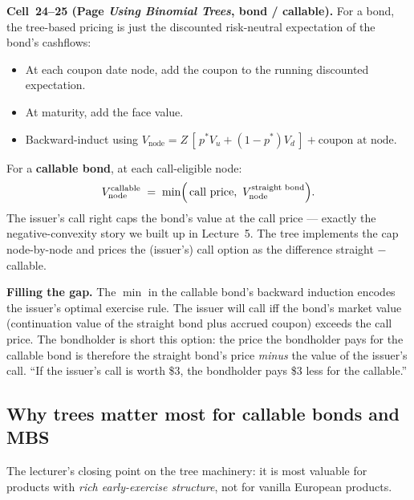 \begin{keyblock}
\textbf{Cell~24--25 (Page \emph{Using Binomial Trees}, bond / callable).}
For a bond, the tree-based pricing is just the discounted
risk-neutral expectation of the bond's cashflows:
\begin{itemize}
  \item At each coupon date node, add the coupon to the running
        discounted expectation.
  \item At maturity, add the face value.
  \item Backward-induct using $V_{\text{node}} = Z\,[\,p^* V_u +
        (1-p^*) V_d\,] + \text{coupon at node}$.
\end{itemize}
For a \textbf{callable bond}, at each call-eligible node:
\[
  V_{\text{node}}^{\text{callable}}
    \;=\; \min\Bigl(\,
              \text{call price},\ V_{\text{node}}^{\text{straight bond}}
            \Bigr).
\]
The issuer's call right caps the bond's value at the call price ---
exactly the negative-convexity story we built up in Lecture~5.
The tree implements the cap node-by-node and prices the (issuer's)
call option as the difference straight $-$ callable.
\end{keyblock}

\begin{tipblock}
\textbf{Filling the gap.} The $\min$ in the callable bond's
backward induction encodes the issuer's optimal exercise rule.
The issuer will call iff the bond's market value (continuation
value of the straight bond plus accrued coupon) exceeds the call
price. The bondholder is short this option: the price the bondholder
pays for the callable bond is therefore the straight bond's price
\emph{minus} the value of the issuer's call. ``If the issuer's call
is worth \$3, the bondholder pays \$3 less for the callable.''
\end{tipblock}

\subsection{Why trees matter most for callable bonds and MBS}\label{L8-sec:whyimportant}

The lecturer's closing point on the tree machinery: it is most
valuable for products with \emph{rich early-exercise structure}, not
for vanilla European products.

